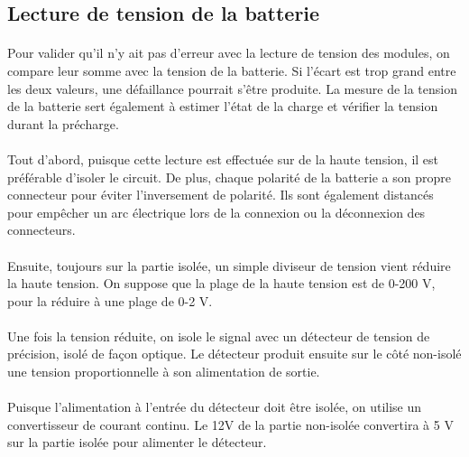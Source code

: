 \subsection{Lecture de tension de la batterie}
	\paragraph*{}
	Pour valider qu'il n'y ait pas d'erreur avec la lecture de tension des modules, on compare leur somme avec la tension de la batterie. Si l'écart est trop grand entre les deux valeurs, une défaillance pourrait s'être produite. La mesure de la tension de la batterie sert également à estimer l'état de la charge et vérifier la tension durant la précharge. 
	
	\paragraph*{}
	Tout d'abord, puisque cette lecture est effectuée sur de la haute tension, il est préférable d'isoler le circuit. De plus, chaque polarité de la batterie a son propre connecteur pour éviter l'inversement de polarité. Ils sont également distancés pour empêcher un arc électrique lors de la connexion ou la déconnexion des connecteurs.
	
	\paragraph*{}
	Ensuite, toujours sur la partie isolée, un simple diviseur de tension vient réduire la haute tension. On suppose que la plage de la haute tension est de 0-200 V, pour la réduire à une plage de 0-2 V.
	
	\paragraph*{}
	Une fois la tension réduite, on isole le signal avec un détecteur de tension de précision, isolé de façon optique. Le détecteur produit ensuite sur le côté non-isolé une tension proportionnelle à son alimentation de sortie.
	
	\paragraph*{}	
	Puisque l'alimentation à l'entrée du détecteur doit être isolée, on utilise un convertisseur de courant continu. Le 12V de la partie non-isolée convertira à 5 V sur la partie isolée pour alimenter le détecteur.
	
